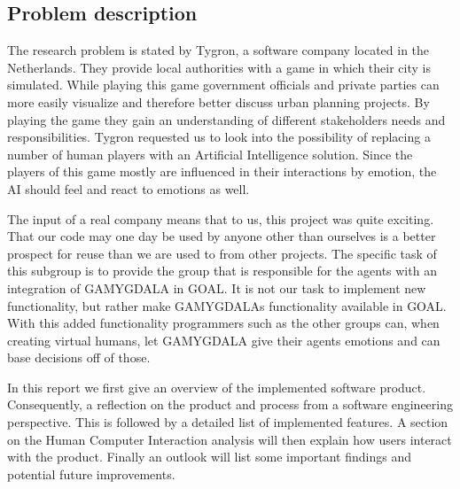 \documentclass[11pt]{article}
\begin{document}
\subsection{Problem description}
The research problem is stated by Tygron, a software company located in the Netherlands. They provide local authorities with a game in which their city is simulated. While playing this game government officials and private parties can more easily visualize and therefore better discuss urban planning projects. By playing the game they gain an understanding of different stakeholders needs and responsibilities. Tygron requested us to look into the possibility of replacing a number of human players with an Artificial Intelligence solution. Since the players of this game mostly are influenced in their interactions by emotion, the AI should feel and react to emotions as well.\par 
The input of a real company means that to us, this project was quite exciting. That our code may one day be used by anyone other than ourselves is a better prospect for reuse than we are used to from other projects. The specific task of this subgroup is to provide the group that is responsible for the agents with an integration of GAMYGDALA in GOAL. It is not our task to implement new functionality, but rather make GAMYGDALAs functionality available in GOAL.  With this added functionality programmers such as the other groups can, when creating virtual humans, let GAMYGDALA give their agents emotions and can base decisions off of those.\par 
In this report we first give an overview of the implemented software product. Consequently, a reflection on the product and process from a software engineering perspective. This is followed by a detailed list of implemented features. A section on the Human Computer Interaction analysis will then explain how users interact with the product. Finally an outlook will list some important findings and potential future improvements.
\end{document}
